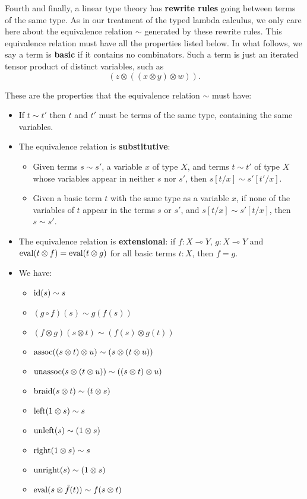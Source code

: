 \documentclass[12pt]{article}
\newcommand{\lhom}{\multimap}
\newcommand{\tensor}{\otimes}
\newcommand{\Id}{{\rm id}}
\newcommand{\eval}{{\rm eval}}
\newcommand{\assoc}{{\rm assoc}}
\newcommand{\unassoc}{{\rm unassoc}}
\newcommand{\braid}{{\rm braid}}
\newcommand{\Left}{{\rm left}}
\newcommand{\Right}{{\rm right}}
\newcommand{\unright}{{\rm unright}}
\newcommand{\unleft}{{\rm unleft}}
\begin{document}
Fourth and finally, a linear type theory has {\bf rewrite rules} going
between terms of the same type.  As in our treatment of the typed
lambda calculus, we only care here about the equivalence relation
$\sim$ generated by these rewrite rules.  This equivalence relation
must have all the properties listed below.  In what follows, we say a
term is {\bf basic} if it contains no combinators.  Such a term is
just an iterated tensor product of distinct variables, such as
\[              (z \tensor ((x \tensor y) \tensor w)) .\]

These are the properties that the equivalence relation $\sim$ must have:
\begin{itemize}
\item
If $t \sim t'$ then $t$ and $t'$ must be terms of the same type,
containing the same variables.
\item The equivalence relation is {\bf substitutive}: 
\begin{itemize} 
\item 
Given terms $s \sim s'$, a variable $x$ of type $X$,
and terms $t \sim t'$ of type $X$ whose variables appear in 
neither $s$ nor $s'$, then $s[t/x] \sim s'[t'/x]$.  
\item 
Given a basic term $t$ with the same type as a variable
$x$, if none of the variables of $t$ appear in the terms
$s$ or $s'$, and $s[t/x] \sim s'[t/x]$, then $s \sim s'$.
\end{itemize}
\item The equivalence relation is {\bf extensional}: if 
$f : X \lhom Y$, $g: X \lhom Y$ and 
$\eval(t \tensor f) = \eval(t \tensor g)$ for all basic terms 
$t:X$, then $f = g$.  
\item We have:
    \begin{itemize}
      \item $\Id(s) \sim s$
      \item $(g \circ f)(s) \sim g(f(s))$
      \item $(f \tensor g)(s \tensor t) \sim (f(s)\tensor g(t))$
      \item $\assoc((s \tensor t) \tensor u) 
             \sim (s \tensor (t \tensor u))$
      \item $\unassoc(s \tensor (t \tensor u))
             \sim ((s \tensor t) \tensor u)$
      \item $\braid(s \tensor t) \sim (t \tensor s)$
      \item $\Left(1 \tensor s) \sim s$
      \item $\unleft(s) \sim (1 \tensor s)$
      \item $\Right(1 \tensor s) \sim s$
      \item $\unright(s) \sim (1 \tensor s)$
      \item $\eval(s \tensor \tilde{f}(t)) \sim f(s \tensor t)$
    \end{itemize}
\end{itemize}
\end{document}
